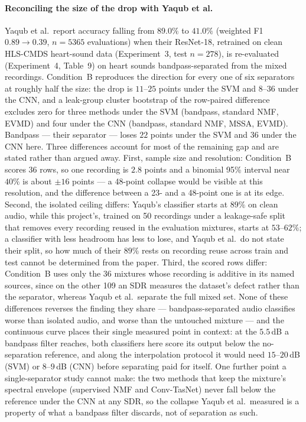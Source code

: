 \documentclass[conference]{IEEEtran}
\begin{document}
\paragraph{Reconciling the size of the drop with Yaqub et al.}
Yaqub et al.\ report accuracy falling from $89.0\%$ to $41.0\%$ (weighted F1 $0.89 \to 0.39$, $n{=}5365$ evaluations) when their ResNet-18, retrained on clean HLS-CMDS heart-sound data (Experiment~3, test $n{=}278$), is re-evaluated (Experiment~4, Table~9) on heart sounds bandpass-separated from the mixed recordings. Condition~B reproduces the direction for every one of six separators at roughly half the size: the drop is $11$--$25$ points under the SVM and $8$--$36$ under the CNN, and a leak-group cluster bootstrap of the row-paired difference excludes zero for three methods under the SVM (bandpass, standard NMF, EVMD) and four under the CNN (bandpass, standard NMF, MSSA, EVMD). Bandpass --- their separator --- loses $22$ points under the SVM and $36$ under the CNN here. Three differences account for most of the remaining gap and are stated rather than argued away. First, sample size and resolution: Condition~B scores 36 rows, so one recording is $2.8$ points and a binomial 95\% interval near $40\%$ is about $\pm16$ points --- a 48-point collapse would be visible at this resolution, and the difference between a 23- and a 48-point one is at its edge. Second, the isolated ceiling differs: Yaqub's classifier starts at $89\%$ on clean audio, while this project's, trained on 50 recordings under a leakage-safe split that removes every recording reused in the evaluation mixtures, starts at $53$--$62\%$; a classifier with less headroom has less to lose, and Yaqub et al.\ do not state their split, so how much of their $89\%$ rests on recording reuse across train and test cannot be determined from the paper. Third, the scored rows differ: Condition~B uses only the 36 mixtures whose recording is additive in its named sources, since on the other 109 an SDR measures the dataset's defect rather than the separator, whereas Yaqub et al.\ separate the full mixed set. None of these differences reverses the finding they share --- bandpass-separated audio classifies worse than isolated audio, and worse than the untouched mixture --- and the continuous curve places their single measured point in context: at the $5.5$\,dB a bandpass filter reaches, both classifiers here score its output below the no-separation reference, and along the interpolation protocol it would need $15$--$20$\,dB (SVM) or $8$--$9$\,dB (CNN) before separating paid for itself. One further point a single-separator study cannot make: the two methods that keep the mixture's spectral envelope (supervised NMF and Conv-TasNet) never fall below the reference under the CNN at any SDR, so the collapse Yaqub et al.\ measured is a property of what a bandpass filter discards, not of separation as such.
\end{document}
